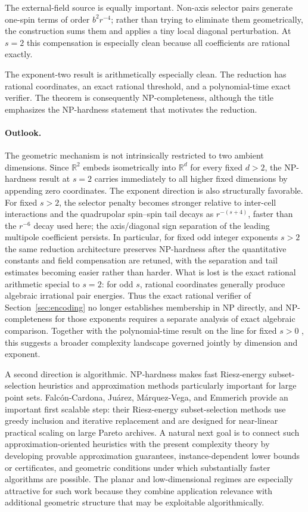 \documentclass[12pt,a4paper]{article}
\newcommand{\R}{\mathbb{R}}
\begin{document}
The external-field source is equally important.  Non-axis selector pairs generate one-spin terms of order $b^2r^{-4}$; rather than trying to eliminate them geometrically, the construction sums them and applies a tiny local diagonal perturbation.  At $s=2$ this compensation is especially clean because all coefficients are rational exactly.

The exponent-two result is arithmetically especially clean.  The reduction has rational coordinates, an exact rational threshold, and a polynomial-time exact verifier.  The theorem is consequently NP-completeness, although the title emphasizes the NP-hardness statement that motivates the reduction.

\paragraph{Outlook.}
The geometric mechanism is not intrinsically restricted to two ambient dimensions.  Since $\R^2$ embeds isometrically into $\R^d$ for every fixed $d>2$, the NP-hardness result at $s=2$ carries immediately to all higher fixed dimensions by appending zero coordinates.  The exponent direction is also structurally favorable.  For fixed $s>2$, the selector penalty becomes stronger relative to inter-cell interactions and the quadrupolar spin--spin tail decays as $r^{-(s+4)}$, faster than the $r^{-6}$ decay used here; the axis/diagonal sign separation of the leading multipole coefficient persists.  In particular, for fixed odd integer exponents $s>2$ the same reduction architecture preserves NP-hardness after the quantitative constants and field compensation are retuned, with the separation and tail estimates becoming easier rather than harder.  What is lost is the exact rational arithmetic special to $s=2$: for odd $s$, rational coordinates generally produce algebraic irrational pair energies.  Thus the exact rational verifier of Section~\ref{sec:encoding} no longer establishes membership in NP directly, and NP-completeness for those exponents requires a separate analysis of exact algebraic comparison.  Together with the polynomial-time result on the line for fixed $s>0$ \cite{EmmerichLine2026}, this suggests a broader complexity landscape governed jointly by dimension and exponent.

A second direction is algorithmic.  NP-hardness makes fast Riesz-energy subset-selection heuristics and approximation methods particularly important for large point sets.  Falc\'on-Cardona, Ju\'arez, M\'arquez-Vega, and Emmerich \cite{FalconCardonaJuarezMarquezVegaEmmerich2026} provide an important first scalable step: their Riesz-energy subset-selection methods use greedy inclusion and iterative replacement and are designed for near-linear practical scaling on large Pareto archives.  A natural next goal is to connect such approximation-oriented heuristics with the present complexity theory by developing provable approximation guarantees, instance-dependent lower bounds or certificates, and geometric conditions under which substantially faster algorithms are possible.  The planar and low-dimensional regimes are especially attractive for such work because they combine application relevance with additional geometric structure that may be exploitable algorithmically.
\end{document}
